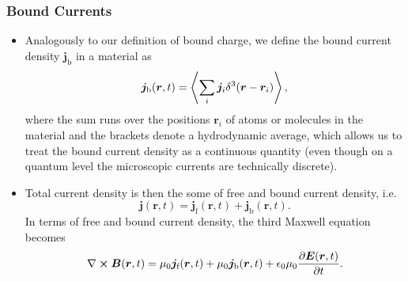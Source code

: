 \documentclass[11pt, a4paper]{article}
\renewcommand{\vec}[1]{\bm{#1}} %
\renewcommand{\r}{\vec{r}}
\newcommand{\E}{\vec{E}} %
\newcommand{\B}{\vec{B}} %
\newcommand{\ee}{\epsilon_{0}}  %
\newcommand{\mm}{\mu_{0}}  %
\renewcommand{\j}{\vec{j}}  %
\renewcommand{\curl}{\nabla \cross}
\begin{document}
\subsubsection{Bound Currents}
\begin{itemize}
	\item Analogously to our definition of bound charge, we define the bound current density $ \j_{\text{b}} $ in a material as
	\begin{equation*}
		\j_{\text{b}}(\r, t) = \ev{\sum_{i}\j_{i}\delta^{3}(\r - \r_{i})},
	\end{equation*}
    where the sum runs over the positions $ \r_{i} $ of atoms or molecules in the material and the brackets denote a hydrodynamic average, which allows us to treat the bound current density as a continuous quantity (even though on a quantum level the microscopic currents are technically discrete).

    \item Total current density is then the some of free and bound current density, i.e.
    \begin{equation*}
        \j(\r, t) = \j_{\text{f}}(\r, t) + \j_{\text{b}}(\r, t).
    \end{equation*}
    In terms of free and bound current density, the third Maxwell equation becomes
	\begin{equation*}
		\curl \B(\r, t) = \mm \j_{\text{f}}(\r, t) + \mm \j_{\text{b}}(\r, t) + \ee \mm \pdv{\E(\r, t)}{t}.
	\end{equation*}
\end{itemize}
\end{document}
